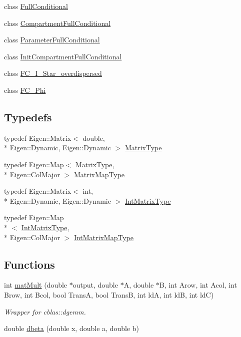 \begin{DoxyCompactItemize}
class \hyperlink{classSpatialSEIR_1_1FullConditional}{Full\-Conditional}
\item 
class \hyperlink{classSpatialSEIR_1_1CompartmentFullConditional}{Compartment\-Full\-Conditional}
\item 
class \hyperlink{classSpatialSEIR_1_1ParameterFullConditional}{Parameter\-Full\-Conditional}
\item 
class \hyperlink{classSpatialSEIR_1_1InitCompartmentFullConditional}{Init\-Compartment\-Full\-Conditional}
\item 
class \hyperlink{classSpatialSEIR_1_1FC__I__Star__overdispersed}{F\-C\-\_\-\-I\-\_\-\-Star\-\_\-overdispersed}
\item 
class \hyperlink{classSpatialSEIR_1_1FC__Phi}{F\-C\-\_\-\-Phi}
\end{DoxyCompactItemize}
\subsection*{Typedefs}
\begin{DoxyCompactItemize}
\item 
typedef Eigen\-::\-Matrix$<$ double, \\*
Eigen\-::\-Dynamic, Eigen\-::\-Dynamic $>$ \hyperlink{namespaceSpatialSEIR_a998a0502213346d0f88197c232de3331}{Matrix\-Type}
\item 
typedef Eigen\-::\-Map$<$ \hyperlink{namespaceSpatialSEIR_a998a0502213346d0f88197c232de3331}{Matrix\-Type}, \\*
Eigen\-::\-Col\-Major $>$ \hyperlink{namespaceSpatialSEIR_a56ce20bdcae25d006d2ddc637596dbd3}{Matrix\-Map\-Type}
\item 
typedef Eigen\-::\-Matrix$<$ int, \\*
Eigen\-::\-Dynamic, Eigen\-::\-Dynamic $>$ \hyperlink{namespaceSpatialSEIR_a61e75b01f74b5a08c1528ac3bce40efd}{Int\-Matrix\-Type}
\item 
typedef Eigen\-::\-Map\\*
$<$ \hyperlink{namespaceSpatialSEIR_a61e75b01f74b5a08c1528ac3bce40efd}{Int\-Matrix\-Type}, \\*
Eigen\-::\-Col\-Major $>$ \hyperlink{namespaceSpatialSEIR_aef5eeacdd778eee57264f9ca171dd505}{Int\-Matrix\-Map\-Type}
\end{DoxyCompactItemize}
\subsection*{Functions}
\begin{DoxyCompactItemize}
\item 
int \hyperlink{namespaceSpatialSEIR_ae9956198541f82c6e0ba7cd8221fee88}{mat\-Mult} (double $\ast$output, double $\ast$A, double $\ast$B, int Arow, int Acol, int Brow, int Bcol, bool Trans\-A, bool Trans\-B, int ld\-A, int ld\-B, int ld\-C)
\begin{DoxyCompactList}\small\item\em Wrapper for cblas\-::dgemm. \end{DoxyCompactList}\item 
double \hyperlink{namespaceSpatialSEIR_a5111a2bb19b97c248bbd9c39e8269f19}{dbeta} (double x, double a, double b)
\end{DoxyCompactItemize}


